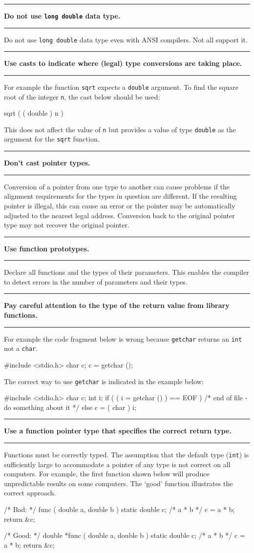 \documentclass[twoside,11pt,nolof,noabs]{starlink}
\newcounter{sruleno}
\newcommand{\srule}[1]{
    \addtocounter{sruleno}{1}
    \goodbreak
    \rule{\textwidth}{0.3mm}
    \textbf{#1} \scpushright{\textbf{\thesruleno}}
    \rule{\textwidth}{0.1mm}
}
\begin{document}
\srule{Do not use \texttt{long double} data type.}
Do not use \texttt{long double} data type even with ANSI compilers. Not all
support it.

\srule{Use casts to indicate where (legal) type conversions are taking
place.}
For example the function \texttt{sqrt} expects a \texttt{double} argument.
To find the square root of the integer \texttt{n}, the cast below should be
used:
\begin{terminalv}
      sqrt ( ( double ) n )
\end{terminalv}
This does not affect the value of \texttt{n} but provides a value of type
\texttt{double} as the argument for the \texttt{sqrt} function.


\srule{Don't cast pointer types.}
Conversion of a pointer from one type to another can cause problems if the
alignment requirements for the types in question are different.
If the resulting pointer is illegal, this can cause an error or the pointer
may be automatically adjusted to the nearest legal address.
Conversion back to the original pointer type may not recover the original
pointer.

\srule{Use function prototypes.}
Declare all functions and the types of their parameters.  This enables the
compiler to detect errors in the number of parameters and their types.

\srule{Pay careful attention to the type of the return value from
library functions.}
For example the code fragment below is wrong because \texttt{getchar} returns
an \texttt{int} not a \texttt{char}.
\begin{terminalv}
      #include <stdio.h>
      char c;
      c = getchar ();
\end{terminalv}
The correct way to use \texttt{getchar} is indicated in the example below:
\begin{terminalv}
      #include <stdio.h>
      char c;
      int i;
      if ( ( i = getchar () ) == EOF )
          /* end of file - do something about it */
      else
          c = ( char ) i;
\end{terminalv}

\srule{Use a function pointer type that specifies the correct return type.}
Functions must be correctly typed.
The assumption that the default
type (\texttt{int}) is sufficiently large to accommodate a pointer of any
type is not correct on all computers.
For example,  the first function shown below will produce unpredictable
results on some computers.
The `good' function illustrates the correct approach.
\begin{terminalv}
      /* Bad: */
      func ( double a, double b )
      {
         static double c; /* a * b */
         c = a * b;
         return &c;
      }

      /* Good: */
      double *func ( double a, double b )
      {
         static double c; /* a * b */
         c = a * b;
         return &c;
      }
\end{terminalv}
\end{document}

